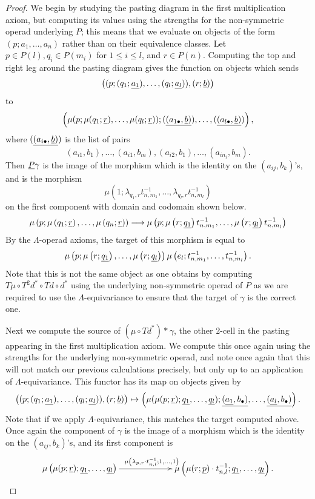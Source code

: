 \begin{proof}
We begin by studying the pasting diagram in the first multiplication axiom, but computing its values using the strengths for the non-symmetric operad underlying $P$; this means that we evaluate on objects of the form $(p; a_{1}, \ldots, a_{n})$ rather than on their equivalence classes. Let $p \in P(l), q_{i} \in P(m_{i})$ for $1 \leq i \leq l$, and $r \in P(n)$. Computing the top and right leg around the pasting diagram gives the function on objects which sends
  \[
    \left( (p; (q_{1}; \underline{a_{1}}), \ldots, (q_{l}; \underline{a_{l}})), (r; \underline{b}) \right)
  \]
to
  \[
    \left( \mu(p; \mu(q_{1}; \underline{r}), \ldots, \mu(q_{l}; \underline{r})); (\underline{(a_{1\bullet}, \underline{b})}), \ldots, (\underline{(a_{l\bullet}, \underline{b})}) \right),
  \]
where $(\underline{(a_{i\bullet}, \underline{b})})$ is the list of pairs
  \[
    (a_{i1}, b_{1}), \ldots, (a_{i1}, b_{m}), (a_{i2}, b_{1}), \ldots, (a_{in_{i}}, b_{m}).
  \]
Then $\underline{P}\gamma$ is the image of the morphism which is the identity on the $(a_{ij}, b_{k})$'s, and is the morphism
  \[
    \mu\left(1;\lambda_{q_1,r}t^{-1}_{n,m_1},\ldots,\lambda_{q_l,r}t^{-1}_{n,m_l}\right)
  \]
on the first component with domain and codomain shown below.
  \[
    \mu\left(p;\mu\left(q_1;\underline{r}\right),\ldots,\mu\left(q_n;\underline{r}\right)\right) \longrightarrow \mu\left(p;\mu\left(r;\underline{q_1}\right)t^{-1}_{n,m_1},\ldots,\mu\left(r;\underline{q_l}\right)t^{-1}_{n,m_l}\right)
  \]
By the $\Lambda$-operad axioms, the target of this morphism is equal to
  \[
    \mu\left(p; \mu\left(r; \underline{q_{1}}\right), \ldots, \mu\left(r; \underline{q_{l}}\right) \right)\mu\left(e_{l}; t^{-1}_{n,m_{1}}, \ldots, t^{-1}_{n,m_{l}}\right).
  \]
Note that this is not the same object as one obtains by computing $T\mu \circ T^{2}d^{*} \circ Td \circ d^{*}$ using the underlying non-symmetric operad of $P$ as we are required to use the $\Lambda$-equivariance to ensure that the target of $\gamma$ is the correct one.

Next we compute the source of $(\mu \circ Td^{*})*\gamma$, the other $2$-cell in the pasting appearing in the first multiplication axiom. We compute this once again using the strengths for the underlying non-symmetric operad, and note once again that this will not match our previous calculations precisely, but only up to an application of $\Lambda$-equivariance. This functor has its map on objects given by
  \[
    \left( (p; (q_{1}; \underline{a_{1}}), \ldots, (q_{l}; \underline{a_{l}})), (r; \underline{b}) \right) \mapsto \left(\mu(\mu(p; \underline{r}); \underline{q_{1}}, \ldots, \underline{q_{l}}); \underline{(\underline{a_{1}}, b_{\bullet})}, \ldots, \underline{(\underline{a_{l}}, b_{\bullet})} \right).
  \]
  Note that if we apply $\Lambda$-equivariance, this matches the target computed above. Once again the component of $\gamma$ is the image of a morphism which is the identity on the $(a_{ij}, b_{k})$'s, and its first component is
  \[
    \xy
      {\ar^{\mu\left(\lambda_{p,r} \cdot t^{-1}_{n,l}; 1, \ldots, 1\right)} (0,0)*+{\mu\left(\mu(p; \un{r}); \un{q_{1}}, \ldots, \un{q_{l}}\right)}; (60,0)*+{\mu\left(\mu(r; \un{p})\cdot t^{-1}_{n,l}; \un{q_{1}}, \ldots, \un{q_{l}}\right).} }
    \endxy
  \]


\end{proof}
